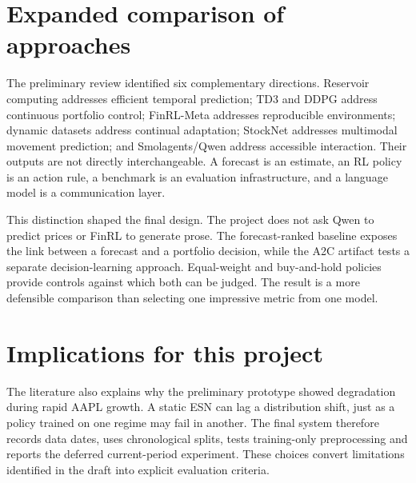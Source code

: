 \section{Expanded comparison of approaches}
The preliminary review identified six complementary directions. Reservoir computing addresses efficient temporal prediction; TD3 and DDPG address continuous portfolio control; FinRL-Meta addresses reproducible environments; dynamic datasets address continual adaptation; StockNet addresses multimodal movement prediction; and Smolagents/Qwen address accessible interaction. Their outputs are not directly interchangeable. A forecast is an estimate, an RL policy is an action rule, a benchmark is an evaluation infrastructure, and a language model is a communication layer.

This distinction shaped the final design. The project does not ask Qwen to predict prices or FinRL to generate prose. The forecast-ranked baseline exposes the link between a forecast and a portfolio decision, while the A2C artifact tests a separate decision-learning approach. Equal-weight and buy-and-hold policies provide controls against which both can be judged. The result is a more defensible comparison than selecting one impressive metric from one model.

\section{Implications for this project}
The literature also explains why the preliminary prototype showed degradation during rapid AAPL growth. A static ESN can lag a distribution shift, just as a policy trained on one regime may fail in another. The final system therefore records data dates, uses chronological splits, tests training-only preprocessing and reports the deferred current-period experiment. These choices convert limitations identified in the draft into explicit evaluation criteria.
